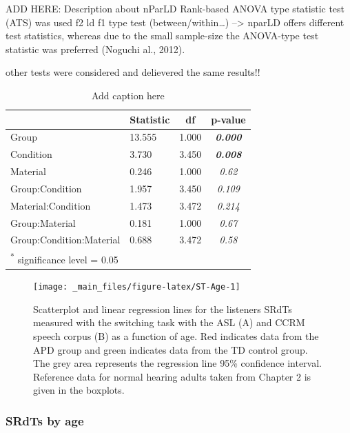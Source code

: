 \documentclass[a4paper, twoside]{templates/ociamthesis}
\begin{document}
ADD HERE: Description about nParLD
Rank-based ANOVA type statistic test (ATS) was used f2 ld f1 type test (between/within\ldots)
--\textgreater{} nparLD offers different test statistics, whereas due to the small sample-size the ANOVA-type test statistic was preferred (Noguchi al., 2012).

other tests were considered and delievered the same results!!

\begin{table}

\caption{\label{tab:ST-ANOVAtab}Add caption here}
\centering
\begin{tabular}[t]{llc>{}c}
\toprule
  & Statistic & df & p-value\\
\midrule
Group & 13.555 & 1.000 & \em{\textbf{0.000}}\\
Condition & 3.730 & 3.450 & \em{\textbf{0.008}}\\
Material & 0.246 & 1.000 & \em{0.62}\\
Group:Condition & 1.957 & 3.450 & \em{0.109}\\
Material:Condition & 1.473 & 3.472 & \em{0.214}\\
\addlinespace
Group:Material & 0.181 & 1.000 & \em{0.67}\\
Group:Condition:Material & 0.688 & 3.472 & \em{0.58}\\
\bottomrule
\multicolumn{4}{l}{\textsuperscript{*} significance level = 0.05}\\
\end{tabular}
\end{table}

\begin{figure}[h]

{\centering \texttt{[image: \_main\_files/figure-latex/ST-Age-1]} 

}

\caption{Scatterplot and linear regression lines for the listeners SRdTs measured with the switching task with the ASL (A) and CCRM speech corpus (B) as a function of age. Red indicates data from the APD group and green indicates data from the TD control group. The grey area represents the regression line 95\% confidence interval. Reference data for normal hearing adults taken from Chapter 2 is given in the boxplots.}\label{fig:ST-Age}
\end{figure}

\hypertarget{srdts-by-age}{%
\subsubsection*{SRdTs by age}\label{srdts-by-age}}
\end{document}
